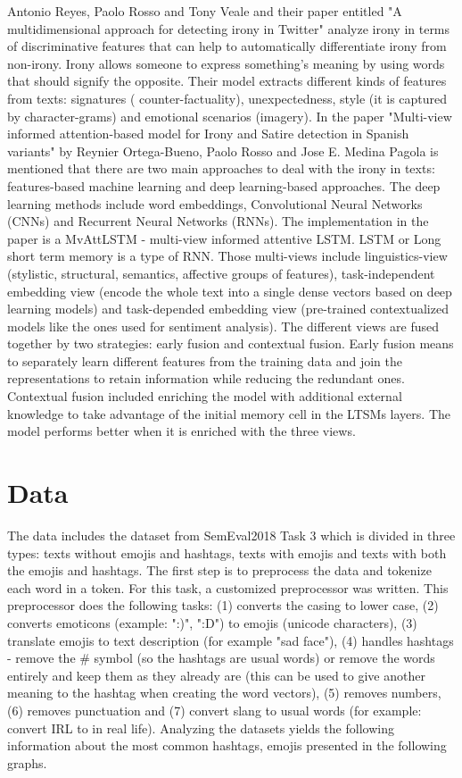 \documentclass[11pt]{article}
\begin{document}
Antonio Reyes, Paolo Rosso and Tony Veale and their paper entitled "A multidimensional approach for detecting irony in Twitter" analyze irony in terms of discriminative features that can help to automatically differentiate irony from non-irony.
Irony allows someone to express something's meaning by using words that should signify the opposite.
Their model extracts different kinds of features from texts: signatures ( counter-factuality), unexpectedness, style (it is captured by character-grams) and emotional scenarios (imagery).
In the paper "Multi-view informed attention-based model for Irony and Satire detection in Spanish variants" by Reynier Ortega-Bueno, Paolo Rosso and Jose E. Medina Pagola is mentioned that there are two main approaches to deal with the irony in texts: features-based machine learning and deep learning-based approaches.
The deep learning methods include word embeddings, Convolutional Neural Networks (CNNs) and Recurrent Neural Networks (RNNs).
The implementation in the paper is a MvAttLSTM - multi-view informed attentive LSTM\@.
LSTM or Long short term memory is a type of RNN\@.
Those multi-views include linguistics-view (stylistic, structural, semantics, affective groups of features), task-independent embedding view (encode the whole text into a single dense vectors based on deep learning models) and task-depended embedding view (pre-trained contextualized models like the ones used for sentiment analysis).
The different views are fused together by two strategies: early fusion and contextual fusion.
  Early fusion means to separately learn different features from the training data and join the representations to retain information while reducing the redundant ones.
  Contextual fusion included enriching the model with additional external knowledge to take advantage of the initial memory cell in the LTSMs layers.
  The model performs better when it is enriched with the three views.


\section{Data}\label{sec:data}

  The data includes the dataset from SemEval2018 Task 3 which is divided in three types: texts without emojis and hashtags, texts with emojis and texts with both the emojis and hashtags.
  The first step is to preprocess the data and tokenize each word in a token.
  For this task, a customized preprocessor was written.
  This preprocessor does the following tasks: (1) converts the casing to lower case, (2) converts emoticons (example: ":)", ":D") to emojis (unicode characters), (3) translate emojis to text description (for example "sad face"), (4) handles hashtags - remove the \# symbol (so the hashtags are usual words) or remove the words entirely and keep them as they already are (this can be used to give another meaning to the hashtag when creating the word vectors), (5) removes numbers, (6) removes punctuation and (7) convert slang to usual words (for example: convert IRL to in real life).
Analyzing the datasets yields the following information about the most common hashtags, emojis presented in the following graphs.
\end{document}
